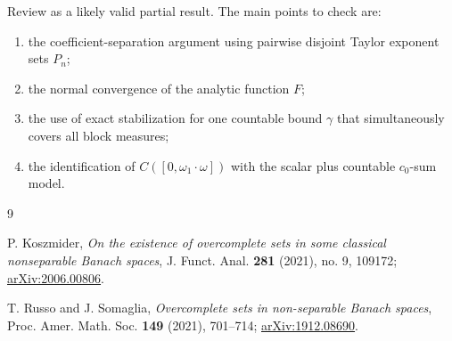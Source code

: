 \documentclass[11pt]{article}
\begin{document}
Review as a likely valid partial result.  The main points to check are:
\begin{enumerate}
\item the coefficient-separation argument using pairwise disjoint Taylor
      exponent sets \(P_n\);
\item the normal convergence of the analytic function \(F\);
\item the use of exact stabilization for one countable bound \(\gamma\) that
      simultaneously covers all block measures;
\item the identification of \(C([0,\omega_1\cdot\omega])\) with the scalar
      plus countable \(c_0\)-sum model.
\end{enumerate}

\begin{thebibliography}{9}

P. Koszmider,
\emph{On the existence of overcomplete sets in some classical nonseparable
Banach spaces},
J. Funct. Anal. \textbf{281} (2021), no. 9, 109172;
\href{https://arxiv.org/abs/2006.00806}{arXiv:2006.00806}.

T. Russo and J. Somaglia,
\emph{Overcomplete sets in non-separable Banach spaces},
Proc. Amer. Math. Soc. \textbf{149} (2021), 701--714;
\href{https://arxiv.org/abs/1912.08690}{arXiv:1912.08690}.

\end{thebibliography}
\end{document}

